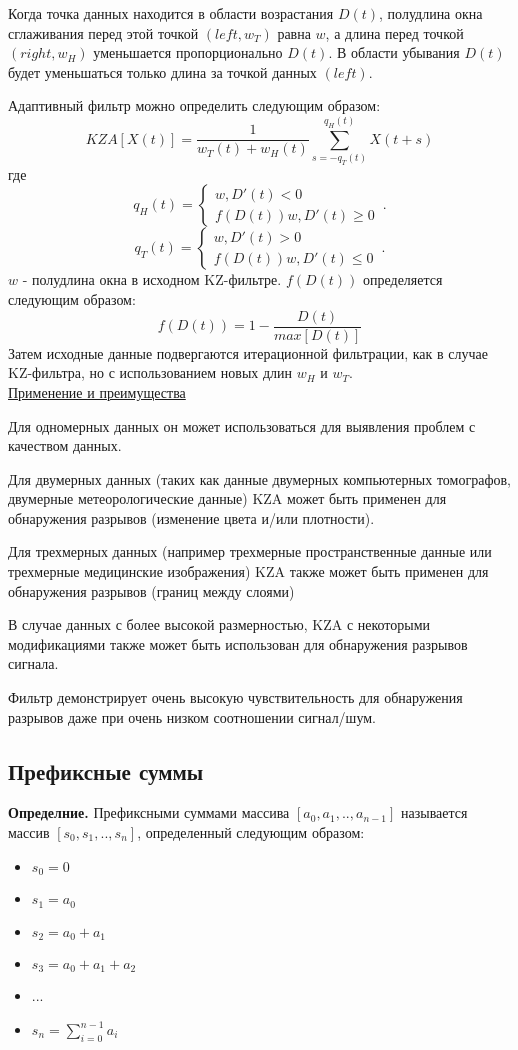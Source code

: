 Когда точка данных находится в области возрастания $D(t)$, полудлина окна сглаживания перед этой точкой $(left, w_T)$ равна $w$, а длина перед точкой $(right, w_H)$ уменьшается пропорционально $D(t)$. В области убывания $D(t)$ будет уменьшаться только длина за точкой данных $(left)$.

Адаптивный фильтр можно определить следующим образом:
$$
KZA[X(t)]=\frac{1}{w_T(t)+w_H(t)}\sum _{s=-q_T(t)}^{q_H(t)}{X(t+s)}
$$
где
\begin{equation*}
    q_H(t) = 
    \begin{cases}
      w, D'(t)<0\\
      f(D(t))w, D'(t)\geq 0
    \end{cases}\,.
\end{equation*}
\begin{equation*}
    q_T(t) = 
    \begin{cases}
      w, D'(t)>0\\
      f(D(t))w, D'(t)\leq 0
    \end{cases}\,.
\end{equation*}
$w$ - полудлина окна в исходном KZ-фильтре. $f(D(t))$ определяется следующим образом:
$$
f(D(t))=1-\frac{D(t)}{max[D(t)]}
$$
Затем исходные данные подвергаются итерационной фильтрации, как в случае KZ-фильтра, но с использованием новых длин $w_H$ и $w_T$.
\\
\underline{Применение и преимущества}

Для одномерных данных он может использоваться для выявления проблем с качеством данных.

Для двумерных данных (таких как данные двумерных компьютерных томографов, двумерные метеорологические данные) KZA может быть применен для обнаружения разрывов (изменение цвета и/или плотности).

Для трехмерных данных (например трехмерные пространственные данные или трехмерные медицинские изображения) KZA также может быть применен для обнаружения разрывов (границ между слоями)

В случае данных с более высокой размерностью, KZA с некоторыми модификациями также может быть использован для обнаружения разрывов сигнала.

Фильтр демонстрирует очень высокую чувствительность для обнаружения разрывов даже при очень низком соотношении сигнал/шум.

\subsection*{Префиксные суммы}
\textbf{Определние.} Префиксными суммами массива $[a_0,a_1,..,a_{n-1}]$ называется массив $[s_0,s_1,..,s_n]$, определенный следующим образом:
\begin{itemize}
    \item $s_0 = 0$
    \item $s_1 = a_0$
    \item $s_2 = a_0 + a_1$
    \item $s_3 = a_0 + a_1 + a_2$
    \item ...
    \item $s_n = \sum_{i = 0}^{n - 1} a_i$
\end{itemize}


